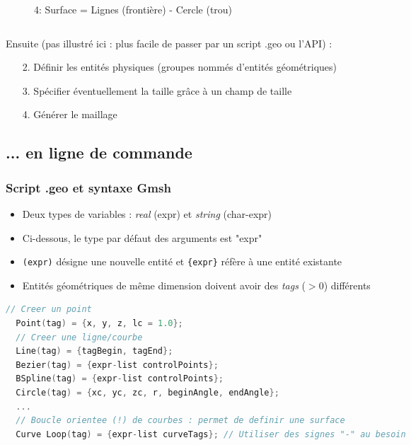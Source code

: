 \documentclass[aspectratio=169]{beamer}
\begin{document}
\begin{frame}[fragile]
\begin{columns}
\begin{column}{0.5\textwidth}
\begin{figure}
      \caption{4: Surface = Lignes (frontière) - Cercle (trou)}
    \end{figure}
  \end{column}
\end{columns}
Ensuite (pas illustré ici : plus facile de passer par un script .geo ou l'API) :
\vspace{-0.2cm}
\begin{enumerate}
  \item[2.] Définir les entités physiques (groupes nommés d'entités géométriques)
  \item[3.] Spécifier éventuellement la taille grâce à un champ de taille
  \item[4.] Générer le maillage
\end{enumerate}

\end{frame}

\subsection{... en ligne de commande}

\begin{frame}[fragile]
\frametitle{Script .geo et syntaxe Gmsh}
\begin{itemize}
  \item Deux types de variables : \textit{real} (expr) et \textit{string} (char-expr)
  \item Ci-dessous, le type par défaut des arguments est "expr"
  \item \texttt{(expr)} désigne une nouvelle entité et \texttt{\{expr\}} réfère à une entité existante
  \item Entités géométriques de même dimension doivent avoir des \textit{tags} ($>0$) différents
\end{itemize}
\begin{lstlisting}[language=c++]
  // Creer un point
  Point(tag) = {x, y, z, lc = 1.0};
  // Creer une ligne/courbe
  Line(tag) = {tagBegin, tagEnd};
  Bezier(tag) = {expr-list controlPoints};
  BSpline(tag) = {expr-list controlPoints};
  Circle(tag) = {xc, yc, zc, r, beginAngle, endAngle};
  ...
  // Boucle orientee (!) de courbes : permet de definir une surface
  Curve Loop(tag) = {expr-list curveTags}; // Utiliser des signes "-" au besoin
\end{lstlisting}
\end{frame}
\end{document}
